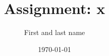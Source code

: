 \newcommand{\mytitle}{Assignment: x}
\newcommand{\myauthor}{First and last name\\ }

\title{\mytitle}
\author{\myauthor}

\date{\today}
